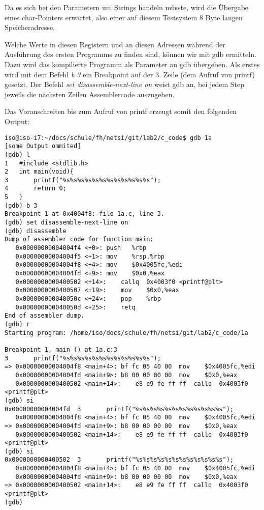 \documentclass[a4paper,11pt,parskip=half]{scrartcl}
\begin{document}
Da es sich bei den Parametern um Strings handeln müsste, wird die Übergabe eines char-Pointers erwartet, also einer auf diesem Testsystem 8 Byte langen Speicheradresse.

Welche Werte in diesen Registern und an diesen Adressen während der Ausführung des ersten Programms zu finden sind, können wir mit gdb ermitteln. Dazu wird das kompilierte Programm als Parameter an gdb übergeben. Als erstes wird mit dem Befehl \emph{b 3} ein Breakpoint auf der 3. Zeile (dem Aufruf von printf) gesetzt. Der Befehl \emph{set disassemble-next-line on} weist gdb an, bei jedem Step jeweils die nächsten Zeilen Assemblercode auszugeben. 

Das Voranschreiten bis zum Aufruf von printf erzeugt somit den folgenden Output:
\begin{lstlisting}
iso@iso-i7:~/docs/schule/fh/netsi/git/lab2/c_code$ gdb 1a
[some Output ommited]
(gdb) l
1	#include <stdlib.h>
2	int main(void){
3		printf("%s%s%s%s%s%s%s%s%s%s%s%s");
4		return 0;
5	}
(gdb) b 3
Breakpoint 1 at 0x4004f8: file 1a.c, line 3.
(gdb) set disassemble-next-line on
(gdb) disassemble 
Dump of assembler code for function main:
   0x00000000004004f4 <+0>:	push   %rbp
   0x00000000004004f5 <+1>:	mov    %rsp,%rbp
   0x00000000004004f8 <+4>:	mov    $0x4005fc,%edi
   0x00000000004004fd <+9>:	mov    $0x0,%eax
   0x0000000000400502 <+14>:	callq  0x4003f0 <printf@plt>
   0x0000000000400507 <+19>:	mov    $0x0,%eax
   0x000000000040050c <+24>:	pop    %rbp
   0x000000000040050d <+25>:	retq   
End of assembler dump.
(gdb) r
Starting program: /home/iso/docs/schule/fh/netsi/git/lab2/c_code/1a 

Breakpoint 1, main () at 1a.c:3
3		printf("%s%s%s%s%s%s%s%s%s%s%s%s");
=> 0x00000000004004f8 <main+4>:	bf fc 05 40 00	mov    $0x4005fc,%edi
   0x00000000004004fd <main+9>:	b8 00 00 00 00	mov    $0x0,%eax
   0x0000000000400502 <main+14>:	e8 e9 fe ff ff	callq  0x4003f0 <printf@plt>
(gdb) si
0x00000000004004fd	3		printf("%s%s%s%s%s%s%s%s%s%s%s%s");
   0x00000000004004f8 <main+4>:	bf fc 05 40 00	mov    $0x4005fc,%edi
=> 0x00000000004004fd <main+9>:	b8 00 00 00 00	mov    $0x0,%eax
   0x0000000000400502 <main+14>:	e8 e9 fe ff ff	callq  0x4003f0 <printf@plt>
(gdb) si
0x0000000000400502	3		printf("%s%s%s%s%s%s%s%s%s%s%s%s");
   0x00000000004004f8 <main+4>:	bf fc 05 40 00	mov    $0x4005fc,%edi
   0x00000000004004fd <main+9>:	b8 00 00 00 00	mov    $0x0,%eax
=> 0x0000000000400502 <main+14>:	e8 e9 fe ff ff	callq  0x4003f0 <printf@plt>
(gdb)
\end{lstlisting}
\end{document}
